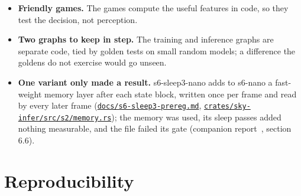\documentclass[10pt]{article}
\begin{document}
\begin{itemize}
\item \textbf{Friendly games.} The games compute the useful features in code, so they test the decision, not perception.
\item \textbf{Two graphs to keep in step.} The training and inference graphs are separate code, tied by golden tests on small random models; a difference the goldens do not exercise would go unseen.
\item \textbf{One variant only made a result.} s6-sleep3-nano adds to s6-nano a fast-weight memory layer after each state block, written once per frame and read by every later frame (\href{https://github.com/maxgfr/skycmd/blob/main/docs/s6-sleep3-prereg.md}{\texttt{docs/\allowbreak{}s6-sleep3-prereg.md}}, \href{https://github.com/maxgfr/skycmd/blob/main/crates/sky-infer/src/s2/memory.rs}{\texttt{crates/\allowbreak{}sky-infer/\allowbreak{}src/\allowbreak{}s2/\allowbreak{}memory.rs}}); the memory was used, its sleep passes added nothing measurable, and the file failed its gate (companion report~\cite{golfier2026skycmd}, section 6.6).
\end{itemize}

\section{Reproducibility}\label{sec:10}
\end{document}
